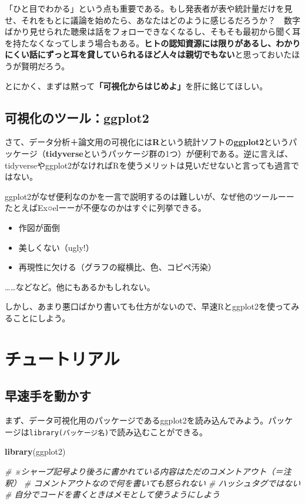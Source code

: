 \documentclass[]{book}
\newenvironment{Shaded}{\begin{snugshade}}{\end{snugshade}}
\newcommand{\KeywordTok}[1]{\textcolor[rgb]{0.13,0.29,0.53}{\textbf{#1}}}
\newcommand{\CommentTok}[1]{\textcolor[rgb]{0.56,0.35,0.01}{\textit{#1}}}
\newcommand{\NormalTok}[1]{#1}
\begin{document}
「ひと目でわかる」という点も重要である。もし発表者が表や統計量だけを見せ、それをもとに議論を始めたら、あなたはどのように感じるだろうか？　数字ばかり見せられた聴衆は話をフォローできなくなるし、そもそも最初から聞く耳を持たなくなってしまう場合もある。\textbf{ヒトの認知資源には限りがあるし、わかりにくい話にずっと耳を貸していられるほど人々は親切でもない}と思っておいたほうが賢明だろう。

とにかく、まずは黙って\textbf{「可視化からはじめよ」}を肝に銘じてほしい。

\section{可視化のツール：ggplot2}\label{ggplot2}

さて、データ分析＋論文用の可視化には\textbf{R}という統計ソフトの\textbf{ggplot2}というパッケージ（\textbf{tidyverse}というパッケージ群の1つ）が便利である。逆に言えば、tidyverseやggplot2がなければRを使うメリットは見いだせないと言っても過言ではない。

ggplot2がなぜ便利なのかを一言で説明するのは難しいが、なぜ他のツールーーたとえばEx○elーーが不便なのかはすぐに列挙できる。

\begin{itemize}
\item
  作図が面倒
\item
  美しくない（ugly!）
\item
  再現性に欠ける（グラフの縦横比、色、コピペ汚染）
\end{itemize}

\ldots{}\ldots{}などなど。他にもあるかもしれない。

しかし、あまり悪口ばかり書いても仕方がないので、早速Rとggplot2を使ってみることにしよう。

\chapter{チュートリアル}\label{tutorial}

\section{早速手を動かす}

まず、データ可視化用のパッケージであるggplot2を読み込んでみよう。パッケージは\texttt{library(パッケージ名)}で読み込むことができる。

\begin{Shaded}
\begin{Highlighting}[]
\KeywordTok{library}\NormalTok{(ggplot2)}

\CommentTok{# ※シャープ記号より後ろに書かれている内容はただのコメントアウト（＝注釈）}
\CommentTok{# コメントアウトなので何を書いても怒られない}
\CommentTok{# ハッシュタグではない}
\CommentTok{# 自分でコードを書くときはメモとして使うようにしよう}
\end{Highlighting}
\end{Shaded}
\end{document}
